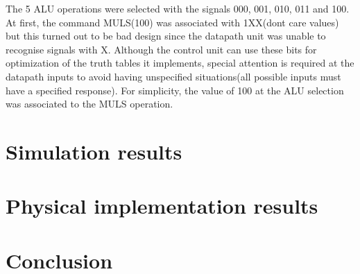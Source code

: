 \documentclass[12pt]{article}
\begin{document}
The 5 ALU operations were selected with the signals 000, 001, 010, 011 and 100. At first, the command MULS(100) was associated with 1XX(dont care values) but this turned out to be bad design since the datapath unit was unable to recognise signals with X. Although the control unit can use these bits for optimization of the truth tables it implements, special attention is required at the datapath inputs to avoid having unspecified situations(all possible inputs must have a specified response). For simplicity, the value of 100 at the ALU selection was associated to the MULS operation.

\section{Simulation results}

\section{Physical implementation results}

\section{Conclusion}
\end{document}
